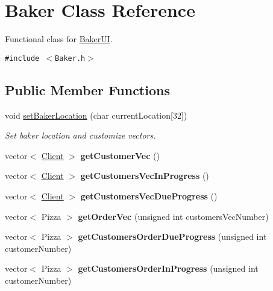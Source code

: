 \hypertarget{class_baker}{
\section{Baker Class Reference}
\label{class_baker}
}
Functional class for \hyperlink{class_baker_u_i}{Baker\-UI}.  


{\tt \#include $<$Baker.h$>$}

\subsection*{Public Member Functions}
\begin{CompactItemize}
\item 
void \hyperlink{class_baker_b85151ecb20282d81b4dab489fea7dd8}{set\-Baker\-Location} (char current\-Location\mbox{[}32\mbox{]})
\begin{CompactList}\small\item\em Set baker location and customize vectors. \item\end{CompactList}\item 
\hypertarget{class_baker_3970b0afe27b514282442b11592e1602}{
vector$<$ \hyperlink{class_client}{Client} $>$ {\bf get\-Customer\-Vec} ()}
\label{class_baker_3970b0afe27b514282442b11592e1602}

\item 
\hypertarget{class_baker_8b798f098bfd9a23b11fa1d63d089609}{
vector$<$ \hyperlink{class_client}{Client} $>$ {\bf get\-Customers\-Vec\-In\-Progress} ()}
\label{class_baker_8b798f098bfd9a23b11fa1d63d089609}

\item 
\hypertarget{class_baker_4c05936fa38e14b768511921a3288c57}{
vector$<$ \hyperlink{class_client}{Client} $>$ {\bf get\-Customers\-Vec\-Due\-Progress} ()}
\label{class_baker_4c05936fa38e14b768511921a3288c57}

\item 
\hypertarget{class_baker_ad0cbeddec394b25c5eade57247f4110}{
vector$<$ Pizza $>$ {\bf get\-Order\-Vec} (unsigned int customers\-Vec\-Number)}
\label{class_baker_ad0cbeddec394b25c5eade57247f4110}

\item 
\hypertarget{class_baker_7c9256e53372bd3a698e40cf64003c50}{
vector$<$ Pizza $>$ {\bf get\-Customers\-Order\-Due\-Progress} (unsigned int customer\-Number)}
\label{class_baker_7c9256e53372bd3a698e40cf64003c50}

\item 
\hypertarget{class_baker_96a7c1ec2dc23919a4e7ca8c399476e1}{
vector$<$ Pizza $>$ {\bf get\-Customers\-Order\-In\-Progress} (unsigned int customer\-Number)}
\label{class_baker_96a7c1ec2dc23919a4e7ca8c399476e1}


\end{CompactItemize}
